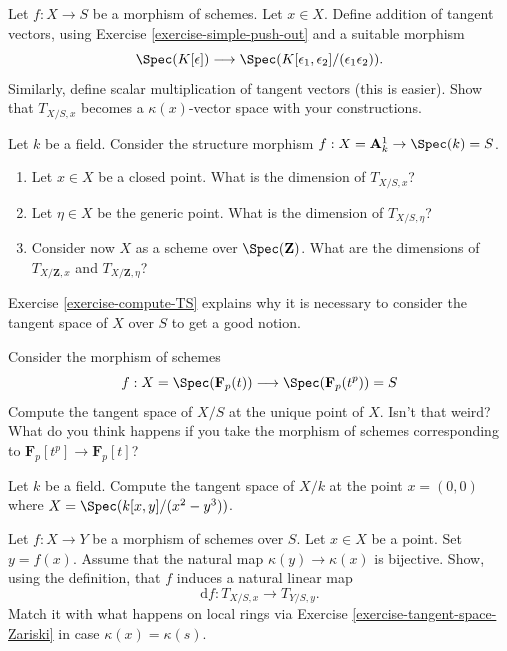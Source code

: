 \begin{exercise}
\label{exercise-tangent-space-vectors-space}
Let $f : X \to S$ be a morphism of schemes.
Let $x \in X$. Define addition of tangent vectors,
using Exercise \ref{exercise-simple-push-out}
and a suitable morphism
$$
\Spec(K[\epsilon])
\longrightarrow
\Spec(K[\epsilon_1, \epsilon_2]/(\epsilon_1\epsilon_2)).
$$
Similarly, define scalar multiplication of tangent vectors (this is easier).
Show that $T_{X/S, x}$ becomes a $\kappa(x)$-vector space with your
constructions.
\end{exercise}

\begin{exercise}
\label{exercise-compute-TS}
Let $k$ be a field. Consider
the structure morphism $f : X = \mathbf{A}^1_k \to \Spec(k) = S$.
\begin{enumerate}
\item Let $x \in X$ be a closed point. What is the dimension of
$T_{X/S, x}$?
\item Let $\eta \in X$ be the generic point. What is the dimension
of $T_{X/S, \eta}$?
\item Consider now $X$ as a scheme over $\Spec(\mathbf{Z})$.
What are the dimensions of $T_{X/\mathbf{Z}, x}$ and
$T_{X/\mathbf{Z}, \eta}$?
\end{enumerate}
\end{exercise}

\begin{remark}
\label{remark-tangent-space-relative}
Exercise \ref{exercise-compute-TS} explains why it is necessary
to consider the tangent space of $X$ over $S$ to get a good notion.
\end{remark}

\begin{exercise}
\label{exercise-compute-TS-field}
Consider the morphism of schemes
$$
f : X = \Spec(\mathbf{F}_p(t))
\longrightarrow
\Spec(\mathbf{F}_p(t^p)) = S
$$
Compute the tangent space of $X/S$ at the unique point of $X$.
Isn't that weird? What do you think happens if you take the morphism
of schemes corresponding to $\mathbf{F}_p[t^p] \to \mathbf{F}_p[t]$?
\end{exercise}

\begin{exercise}
\label{exercise-compute-TS-cusp}
Let $k$ be a field.
Compute the tangent space of $X/k$ at the point $x = (0, 0)$
where $X = \Spec(k[x, y]/(x^2 - y^3))$.
\end{exercise}

\begin{exercise}
\label{exercise-map-tangent-spaces}
Let $f : X \to Y$ be a morphism of schemes over $S$.
Let $x \in X$ be a point. Set $y = f(x)$.
Assume that the natural map $\kappa(y) \to \kappa(x)$ is
bijective. Show, using the definition,
that $f$ induces a natural linear map
$$
\text{d}f : T_{X/S, x} \longrightarrow T_{Y/S, y}.
$$
Match it with what happens on local rings via
Exercise \ref{exercise-tangent-space-Zariski} in case $\kappa(x) = \kappa(s)$.
\end{exercise}


